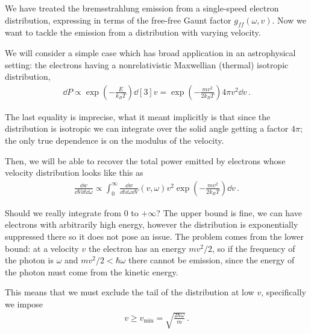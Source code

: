 \documentclass[main.tex]{subfiles}
\begin{document}

We have treated the bremsstrahlung emission from a single-speed electron distribution, expressing in terms of the free-free Gaunt factor \(g_{ff} ( \omega , v)\). Now we want to tackle the emission from a distribution with varying velocity. 

We will consider a simple case which has broad application in an astrophysical setting: the electrons having a nonrelativistic Maxwellian (thermal) isotropic distribution, 
%
\begin{align}
\dd{P} \propto \exp( -\frac{E}{k_B T}) \dd[3]{v} = \exp(- \frac{m v^2}{2 k_B T}) 4 \pi v^2 \dd{v}
\,.
\end{align}

The last equality is imprecise, what it meant implicitly is that since the distribution is isotropic we can integrate over the solid angle getting a factor \(4 \pi \); the only true dependence is on the modulus of the velocity.

Then, we will be able to recover the total power emitted by electrons whose velocity distribution looks like this as 
%
\begin{align}
\frac{ \dd{w}}{ \dd{V} \dd{t} \dd{\omega }} 
\propto 
\int_{0}^{\infty} \frac{ \dd{w}}{ \dd{t} \dd{\omega } \dd{V}} (v, \omega ) v^2 \exp(- \frac{m v^2}{2 k_B T}) \dd{v}
\,.
\end{align}


Should we really integrate from 0 to \(+ \infty \)? The upper bound is fine, we can have electrons with arbitrarily high energy, however the distribution is exponentially suppressed there so it does not pose an issue.
The problem comes from the lower bound: at a velocity \(v\) the electron has an energy \(m v^2 / 2\), so if the frequency of the photon is \(\omega \) and \(m v^2 / 2 < \hbar \omega \) there cannot be emission, since the energy of the photon must come from the kinetic energy. 

This means that we must exclude the tail of the distribution at low \(v\), specifically we impose 
%
\begin{align}
v \geq v _{\text{min}} = \sqrt{\frac{2 \hbar \omega }{m}}
\,.
\end{align}
\end{document}
